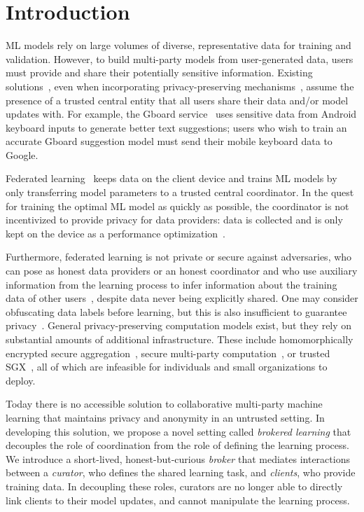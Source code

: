 \chapter{Introduction}
\label{sec:intro}

\ac{ML} models rely on large volumes of diverse,
representative data for training and validation. However, to build
multi-party models from user-generated data, users must provide and
share their potentially sensitive information. Existing 
solutions~\cite{Low:2012, Li:2014}, even when incorporating
privacy-preserving mechanisms~\cite{Abadi:2016}, assume
the presence of a trusted central entity that all users share
their data and/or model updates with. For example, the Gboard
service~\cite{Gboard:2017} uses sensitive data from Android keyboard
inputs to generate better text suggestions; users who wish to train
an accurate Gboard suggestion model must send their mobile keyboard
data to Google.

Federated learning~\cite{McMahan:2017} keeps data on the client device
and trains ML models by only transferring model parameters to a trusted
central coordinator. In the quest for training the optimal ML model as
quickly as possible, the coordinator is not incentivized to provide
privacy for data providers: data is collected and is only kept on the
device as a performance optimization~\cite{McMahan:2017}.  

Furthermore, federated learning is not private or secure against
adversaries, who can pose as honest data providers or an honest
coordinator and who use auxiliary information from the learning process to
infer information about the training data of other 
users~\cite{Hitaj:2017}, despite data never being
explicitly shared. One may consider obfuscating data labels before
learning, but this is also insufficient to guarantee 
privacy~\cite{Calandrino:2011}. General privacy-preserving computation
models exist, but they rely on substantial amounts of additional
infrastructure. These include homomorphically encrypted secure
aggregation~\cite{Bonawitz:2017}, secure multi-party 
computation~\cite{Mohassel:2017}, or trusted 
\ac{SGX}~\cite{Ohrimenko:2016}, all of which are infeasible for
individuals and small organizations to deploy. 

Today there is no accessible solution to collaborative multi-party
machine learning that maintains privacy and anonymity in an untrusted
setting. In developing this solution, we propose a novel setting
called \textit{brokered learning} that decouples the role of
coordination from the role of defining the learning process. We
introduce a short-lived, honest-but-curious \emph{broker} that mediates
interactions between a \emph{curator}, who defines the shared learning
task, and \emph{clients}, who provide training data. In decoupling
these roles, curators are no longer able to directly link clients to
their model updates, and cannot manipulate the learning
process.

